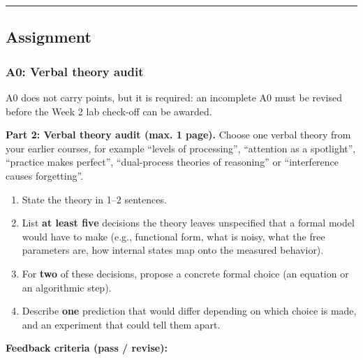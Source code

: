 \begin{center}\rule{0.5\linewidth}{0.5pt}\end{center}


\subsection{Assignment}

\subsubsection{A0: Verbal theory audit}

A0 does not carry points, but it is required: an incomplete A0 must be
revised before the Week 2 lab check-off can be awarded.

\textbf{Part 2: Verbal theory audit (max. 1 page).} Choose one verbal
theory from your earlier courses, for example ``levels of processing'',
``attention as a spotlight'', ``practice makes perfect'', ``dual-process
theories of reasoning'' or ``interference causes forgetting''.

\begin{enumerate}
\def\labelenumi{\arabic{enumi}.}
\tightlist
\item
  State the theory in 1--2 sentences.
\item
  List \textbf{at least five} decisions the theory leaves unspecified
  that a formal model would have to make (e.g., functional form, what is
  noisy, what the free parameters are, how internal states map onto the
  measured behavior).
\item
  For \textbf{two} of these decisions, propose a concrete formal choice
  (an equation or an algorithmic step).
\item
  Describe \textbf{one} prediction that would differ depending on which
  choice is made, and an experiment that could tell them apart.
\end{enumerate}

\textbf{Feedback criteria (pass / revise):}

